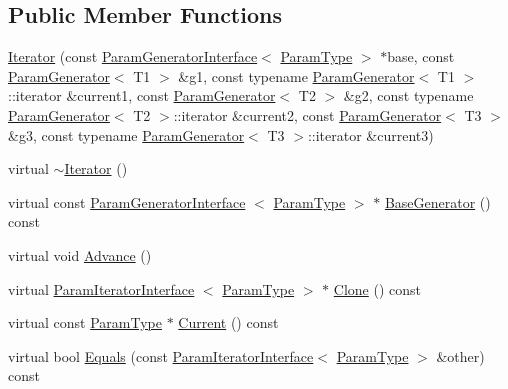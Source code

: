 \subsection*{\-Public \-Member \-Functions}
\begin{DoxyCompactItemize}
\item 
\hyperlink{classtesting_1_1internal_1_1CartesianProductGenerator3_1_1Iterator_a4cef38d7f37a78577b5ecd73e133267e}{\-Iterator} (const \hyperlink{classtesting_1_1internal_1_1ParamGeneratorInterface}{\-Param\-Generator\-Interface}$<$ \hyperlink{classtesting_1_1internal_1_1CartesianProductGenerator3_a61f35be35e7acfed27d8b46ee9713bb3}{\-Param\-Type} $>$ $\ast$base, const \hyperlink{classtesting_1_1internal_1_1ParamGenerator}{\-Param\-Generator}$<$ \-T1 $>$ \&g1, const typename \hyperlink{classtesting_1_1internal_1_1ParamGenerator}{\-Param\-Generator}$<$ \-T1 $>$\-::iterator \&current1, const \hyperlink{classtesting_1_1internal_1_1ParamGenerator}{\-Param\-Generator}$<$ \-T2 $>$ \&g2, const typename \hyperlink{classtesting_1_1internal_1_1ParamGenerator}{\-Param\-Generator}$<$ \-T2 $>$\-::iterator \&current2, const \hyperlink{classtesting_1_1internal_1_1ParamGenerator}{\-Param\-Generator}$<$ \-T3 $>$ \&g3, const typename \hyperlink{classtesting_1_1internal_1_1ParamGenerator}{\-Param\-Generator}$<$ \-T3 $>$\-::iterator \&current3)
\item 
virtual \hyperlink{classtesting_1_1internal_1_1CartesianProductGenerator3_1_1Iterator_a47b331bac1d130f2bab2c40e76ccb54a}{$\sim$\-Iterator} ()
\item 
virtual const \*
\hyperlink{classtesting_1_1internal_1_1ParamGeneratorInterface}{\-Param\-Generator\-Interface}\*
$<$ \hyperlink{classtesting_1_1internal_1_1CartesianProductGenerator3_a61f35be35e7acfed27d8b46ee9713bb3}{\-Param\-Type} $>$ $\ast$ \hyperlink{classtesting_1_1internal_1_1CartesianProductGenerator3_1_1Iterator_a297272d14c33d1d5423da2a4776f895b}{\-Base\-Generator} () const 
\item 
virtual void \hyperlink{classtesting_1_1internal_1_1CartesianProductGenerator3_1_1Iterator_aaa5a890708f89affa1a7726cf152c872}{\-Advance} ()
\item 
virtual \hyperlink{classtesting_1_1internal_1_1ParamIteratorInterface}{\-Param\-Iterator\-Interface}\*
$<$ \hyperlink{classtesting_1_1internal_1_1CartesianProductGenerator3_a61f35be35e7acfed27d8b46ee9713bb3}{\-Param\-Type} $>$ $\ast$ \hyperlink{classtesting_1_1internal_1_1CartesianProductGenerator3_1_1Iterator_a4bee4982ee1152c6935ffd0c2d749421}{\-Clone} () const 
\item 
virtual const \hyperlink{classtesting_1_1internal_1_1CartesianProductGenerator3_a61f35be35e7acfed27d8b46ee9713bb3}{\-Param\-Type} $\ast$ \hyperlink{classtesting_1_1internal_1_1CartesianProductGenerator3_1_1Iterator_ab27aeab5db14a30f077a37989ce9261c}{\-Current} () const 
\item 
virtual bool \hyperlink{classtesting_1_1internal_1_1CartesianProductGenerator3_1_1Iterator_a8f18f9a017a12730cce28c07460bbc14}{\-Equals} (const \hyperlink{classtesting_1_1internal_1_1ParamIteratorInterface}{\-Param\-Iterator\-Interface}$<$ \hyperlink{classtesting_1_1internal_1_1CartesianProductGenerator3_a61f35be35e7acfed27d8b46ee9713bb3}{\-Param\-Type} $>$ \&other) const 
\end{DoxyCompactItemize}
